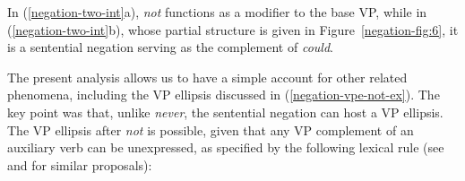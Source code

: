 \documentclass[output=paper,biblatex,babelshorthands,newtxmath,draftmode,colorlinks,citecolor=brown]{langscibook}
\begin{document}
\begin{exe}
\begin{xlist}
\begin{exe}
\begin{xlist}
\eal
\label{negation-two-int}
\zl
%
In (\ref{negation-two-int}a), \textit{not} functions as a modifier to
the base VP, while  in (\ref{negation-two-int}b), whose partial structure is
given in Figure~\ref{negation-fig:6}, it is a sentential
negation serving as the complement of \emph{could}.

The present analysis allows us to have a simple account for other related phenomena,
including the VP ellipsis discussed in (\ref{negation-vpe-not-ex}). The key point
was that, unlike \textit{never}, the sentential negation can
host a VP ellipsis.  The VP ellipsis after \textit{not} is
possible, given that any VP complement of an auxiliary
verb can be unexpressed, as
specified by the following lexical rule (see \citealt[]{Kim:00} and \citealt[]{kimmichaelis:2020} for similar proposals):



\end{xlist}
\end{exe}
\end{xlist}
\end{exe}
\end{document}
